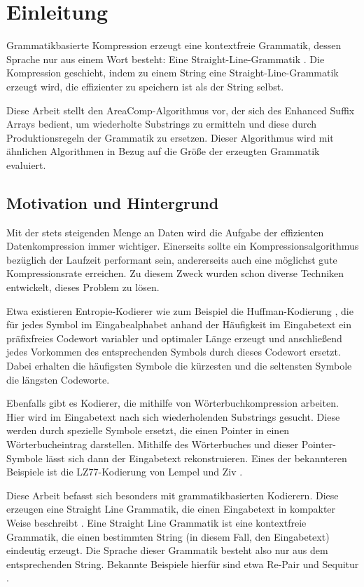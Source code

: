 \chapter{Einleitung}

Grammatikbasierte Kompression erzeugt eine kontextfreie Grammatik, dessen Sprache nur aus einem Wort besteht: Eine Straight-Line-Grammatik \cite{benz_effective_2013}. Die Kompression geschieht, indem zu einem String eine Straight-Line-Grammatik erzeugt wird, die effizienter zu speichern ist als der String selbst.

Diese Arbeit stellt den AreaComp-Algorithmus vor, der sich des Enhanced Suffix Arrays bedient, um wiederholte Substrings zu ermitteln und diese durch Produktionsregeln der Grammatik zu ersetzen.
Dieser Algorithmus wird mit ähnlichen Algorithmen in Bezug auf die Größe der erzeugten Grammatik evaluiert.

\section{Motivation und Hintergrund}

Mit der stets steigenden Menge an Daten wird die Aufgabe der effizienten Datenkompression immer wichtiger. Einerseits sollte ein Kompressionsalgorithmus bezüglich der Laufzeit performant sein, andererseits auch eine möglichst gute Kompressionsrate erreichen. 
Zu diesem Zweck wurden schon diverse Techniken entwickelt, dieses Problem zu lösen. 

Etwa existieren Entropie-Kodierer wie zum Beispiel die Huffman-Kodierung \cite{huffman_method_1952}, die für jedes Symbol im Eingabealphabet anhand der Häufigkeit im Eingabetext ein präfixfreies Codewort variabler und optimaler Länge erzeugt und anschließend jedes Vorkommen des entsprechenden Symbols durch dieses Codewort ersetzt. 
Dabei erhalten die häufigsten Symbole die kürzesten und die seltensten Symbole die längsten Codeworte.

Ebenfalls gibt es Kodierer, die mithilfe von Wörterbuchkompression arbeiten. Hier wird im Eingabetext nach sich wiederholenden Substrings gesucht. Diese werden durch spezielle Symbole ersetzt, die einen Pointer in einen Wörterbucheintrag darstellen. 
Mithilfe des Wörterbuches und dieser Pointer-Symbole lässt sich dann der Eingabetext rekonstruieren.
Eines der bekannteren Beispiele ist die LZ77-Kodierung von Lempel und Ziv \cite{ziv_universal_1977}.

Diese Arbeit befasst sich besonders mit grammatikbasierten Kodierern. Diese erzeugen eine Straight Line Grammatik, die einen Eingabetext in kompakter Weise beschreibt \cite{kieffer_grammar-based_2000}. 
Eine Straight Line Grammatik ist eine kontextfreie Grammatik, die einen bestimmten String (in diesem Fall, den Eingabetext) eindeutig erzeugt. Die Sprache dieser Grammatik besteht also nur aus dem entsprechenden String. Bekannte Beispiele hierfür sind etwa Re-Pair \cite{larsson_offline_1999} und Sequitur \cite{nevill-manning_identifying_1997}.

